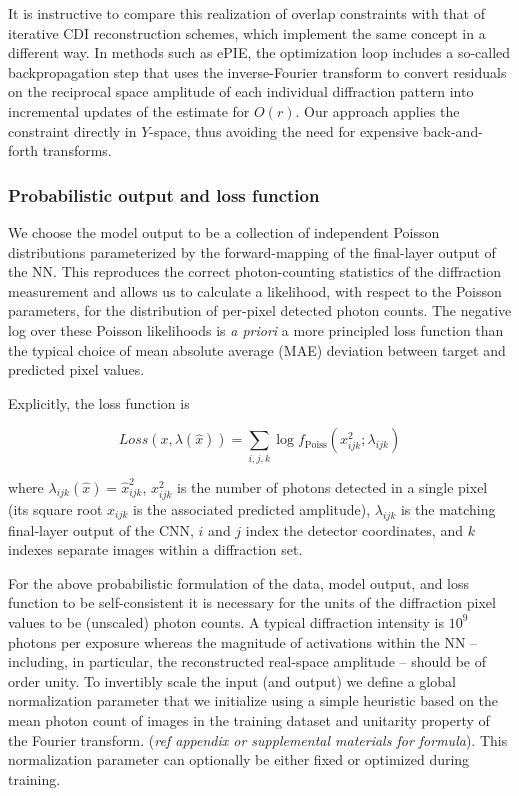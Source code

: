 \documentclass[sn-mathphys]{sn-jnl}%
\theoremstyle{thmstyleone}%
\theoremstyle{thmstyletwo}%
\theoremstyle{thmstylethree}%
\begin{document}
It is instructive to compare this realization of overlap constraints with that of iterative CDI reconstruction schemes, which implement the same concept in a different way. In methods such as ePIE, the optimization loop includes a so-called backpropagation step that uses the inverse-Fourier transform to convert residuals on the reciprocal space amplitude of each individual diffraction pattern into incremental updates of the estimate for $O(r)$. \cite{ePIE} Our approach applies the constraint directly in $Y$-space, thus avoiding the need for expensive back-and-forth transforms. 


\subsubsection{Probabilistic output and loss function}

%

We choose the model output to be a collection of independent Poisson distributions parameterized by the forward-mapping of the final-layer output of the NN. This reproduces the correct photon-counting statistics of the diffraction measurement and allows us to calculate a likelihood, with respect to the Poisson parameters, for the distribution of per-pixel detected photon counts. The negative log over these Poisson likelihoods is \emph{a priori} a more principled loss function than the typical choice of mean absolute average (MAE) deviation between target and predicted pixel values.

Explicitly, the loss function is

$$
Loss(x, \lambda(\hat{x})) = \sum_{i,j,k}\log f_{\text{Poiss}}(x_{ijk}^2;\lambda_{ijk})
$$


where $\lambda_{ijk}(\hat{x}) = \hat{x}_{ijk}^2$, $x_{ijk}^2$ is the number of photons detected in a single pixel (its square root $x_{ijk}$ is the associated predicted amplitude), $\lambda_{ijk}$ is the matching final-layer output of the CNN, $i$ and $j$ index the detector coordinates, and $k$ indexes separate images within a diffraction set. 

For the above probabilistic formulation of the data, model output, and loss function to be self-consistent it is necessary for the units of the diffraction pixel values to be (unscaled) photon counts. A typical diffraction intensity is $10^9$ photons per exposure whereas the magnitude of activations within the NN -- including, in particular, the reconstructed real-space amplitude -- should be of order unity. To invertibly scale the input (and output) we define a global normalization parameter that we initialize using a simple heuristic based on the mean photon count of images in the training dataset and unitarity property of the Fourier transform. (\emph{ref appendix or supplemental materials for formula}). This normalization parameter can optionally be either fixed or optimized during training. 
\end{document}
